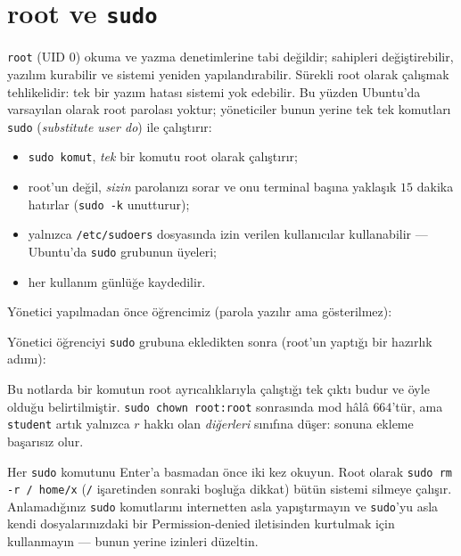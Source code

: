 \documentclass[11pt,a4paper]{article}
\newcommand{\cmd}[1]{\texttt{#1}}
\begin{document}
\section{root ve \cmd{sudo}}

\texttt{root} (UID $0$) okuma ve yazma denetimlerine tabi değildir; sahipleri değiştirebilir, yazılım kurabilir ve sistemi yeniden yapılandırabilir. Sürekli root olarak çalışmak tehlikelidir: tek bir yazım hatası sistemi yok edebilir. Bu yüzden Ubuntu'da varsayılan olarak root parolası yoktur; yöneticiler bunun yerine tek tek komutları \cmd{sudo} (\emph{substitute user do}) ile çalıştırır:
\begin{itemize}
  \item \cmd{sudo komut}, \emph{tek} bir komutu root olarak çalıştırır;
  \item root'un değil, \emph{sizin} parolanızı sorar ve onu terminal başına yaklaşık $15$ dakika hatırlar (\cmd{sudo -k} unutturur);
  \item yalnızca \texttt{/etc/sudoers} dosyasında izin verilen kullanıcılar kullanabilir --- Ubuntu'da \texttt{sudo} grubunun üyeleri;
  \item her kullanım günlüğe kaydedilir.
\end{itemize}

Yönetici yapılmadan önce öğrencimiz (parola yazılır ama gösterilmez):



Yönetici öğrenciyi \texttt{sudo} grubuna ekledikten sonra (root'un yaptığı bir hazırlık adımı):



Bu notlarda bir komutun root ayrıcalıklarıyla çalıştığı tek çıktı budur ve öyle olduğu belirtilmiştir. \cmd{sudo chown root:root} sonrasında mod hâlâ $664$'tür, ama \texttt{student} artık yalnızca $r$ hakkı olan \emph{diğerleri} sınıfına düşer: sonuna ekleme başarısız olur.

\begin{keyidea}
Her \texttt{sudo} komutunu Enter'a basmadan önce iki kez okuyun. Root olarak \texttt{sudo rm -r / home/x} (\texttt{/} işaretinden sonraki boşluğa dikkat) bütün sistemi silmeye çalışır. Anlamadığınız \texttt{sudo} komutlarını internetten asla yapıştırmayın ve \texttt{sudo}'yu asla kendi dosyalarınızdaki bir Permission-denied iletisinden kurtulmak için kullanmayın --- bunun yerine izinleri düzeltin.
\end{keyidea}
\end{document}

